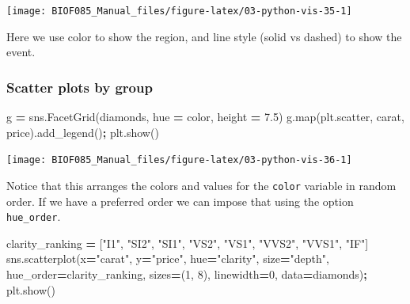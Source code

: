\documentclass[
  letterpaper,
]{scrbook}
\newenvironment{Shaded}{\begin{snugshade}}{\end{snugshade}}
\newcommand{\BuiltInTok}[1]{#1}
\newcommand{\DecValTok}[1]{\textcolor[rgb]{0.00,0.00,0.81}{#1}}
\newcommand{\FloatTok}[1]{\textcolor[rgb]{0.00,0.00,0.81}{#1}}
\newcommand{\NormalTok}[1]{#1}
\newcommand{\OperatorTok}[1]{\textcolor[rgb]{0.81,0.36,0.00}{\textbf{#1}}}
\newcommand{\StringTok}[1]{\textcolor[rgb]{0.31,0.60,0.02}{#1}}
\begin{document}
\begin{center}\texttt{[image: BIOF085\_Manual\_files/figure-latex/03-python-vis-35-1]} \end{center}

Here we use color to show the region, and line style (solid vs dashed) to show the event.

\hypertarget{scatter-plots-by-group}{%
\subsubsection{Scatter plots by group}\label{scatter-plots-by-group}}

\begin{Shaded}
\begin{Highlighting}[]
\NormalTok{g }\OperatorTok{=}\NormalTok{ sns.FacetGrid(diamonds, hue }\OperatorTok{=} \StringTok{\textquotesingle{}color\textquotesingle{}}\NormalTok{, height }\OperatorTok{=} \FloatTok{7.5}\NormalTok{)}
\NormalTok{g.}\BuiltInTok{map}\NormalTok{(plt.scatter, }\StringTok{\textquotesingle{}carat\textquotesingle{}}\NormalTok{, }\StringTok{\textquotesingle{}price\textquotesingle{}}\NormalTok{).add\_legend()}\OperatorTok{;}
\NormalTok{plt.show()}
\end{Highlighting}
\end{Shaded}

\begin{center}\texttt{[image: BIOF085\_Manual\_files/figure-latex/03-python-vis-36-1]} \end{center}

Notice that this arranges the colors and values for the \texttt{color} variable in random order. If we have a preferred order we can impose that using the option \texttt{hue\_order}.

\begin{Shaded}
\begin{Highlighting}[]
\NormalTok{clarity\_ranking }\OperatorTok{=}\NormalTok{ [}\StringTok{"I1"}\NormalTok{, }\StringTok{"SI2"}\NormalTok{, }\StringTok{"SI1"}\NormalTok{, }\StringTok{"VS2"}\NormalTok{, }\StringTok{"VS1"}\NormalTok{, }\StringTok{"VVS2"}\NormalTok{, }\StringTok{"VVS1"}\NormalTok{, }\StringTok{"IF"}\NormalTok{]}
\NormalTok{sns.scatterplot(x}\OperatorTok{=}\StringTok{"carat"}\NormalTok{, y}\OperatorTok{=}\StringTok{"price"}\NormalTok{,}
\NormalTok{                hue}\OperatorTok{=}\StringTok{"clarity"}\NormalTok{, size}\OperatorTok{=}\StringTok{"depth"}\NormalTok{,}
\NormalTok{                hue\_order}\OperatorTok{=}\NormalTok{clarity\_ranking,}
\NormalTok{                sizes}\OperatorTok{=}\NormalTok{(}\DecValTok{1}\NormalTok{, }\DecValTok{8}\NormalTok{), linewidth}\OperatorTok{=}\DecValTok{0}\NormalTok{,}
\NormalTok{                data}\OperatorTok{=}\NormalTok{diamonds)}\OperatorTok{;}
\NormalTok{plt.show() }
\end{Highlighting}
\end{Shaded}
\end{document}
